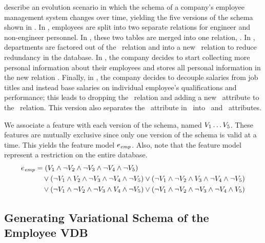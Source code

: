 \citet{prima08Moon} describe an evolution scenario in which the schema of a
company's employee management system changes over time, yielding the five
versions of the schema shown in .
%
In \vOne, employees are split into two separate relations for
engineer and non-engineer personnel.
%
In \vTwo, these two tables are merged into one relation, \empacct.
%
In \vThree, departments are factored out of the \empacct\ relation and
into a new \dept\ relation to reduce redundancy in the database.
%
In \vFour, the company decides to start collecting more personal
information about their employees and stores all personal information in the
new relation \empbio.
%
Finally, in \vFive, the company decides to decouple salaries from
job titles and instead base salaries on individual employee's qualifications
and performance; this leads to dropping the \job\ relation and adding a new
\salary\ attribute to the \empacct\ relation. This version also separates the
\name\ attribute in \empbio\ into \fname\ and \lname\ attributes.


We associate a feature with each version of the schema, named 
$\vOne\ldots\vFive$.
%
These features are mutually exclusive since only one version of the
schema is valid at a time. This yields the  feature model
$\dimMeta_\employee$.
%
 Also, note that the feature model represent a restriction on the entire
 database.
%
\begin{align*}
\dimMeta_\employee
  &=   \left(\vOne\wedge\neg\vTwo\wedge\neg\vThree\wedge\neg\vFour\wedge\neg\vFive\right)\\
  &\quad
  \vee\left(\neg\vOne\wedge\vTwo\wedge\neg\vThree\wedge\neg\vFour\wedge\neg\vFive\right)
  \vee\left(\neg\vOne\wedge\neg\vTwo\wedge\vThree\wedge\neg\vFour\wedge\neg\vFive\right)\\
   &\quad
   \vee\left(\neg\vOne\wedge\neg\vTwo\wedge\neg\vThree\wedge\vFour\wedge\neg\vFive\right)
  \vee\left(\neg\vOne\wedge\neg\vTwo\wedge\neg\vThree\wedge\neg\vFour\wedge\vFive\right)
\end{align*}



\subsection{Generating Variational Schema of the Employee VDB}
\label{sec:emp-vsch}

